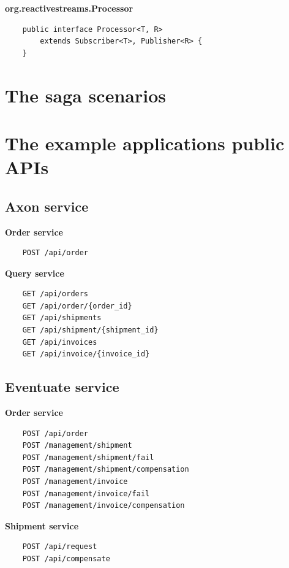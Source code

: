 \documentclass[oneside,
  digital, %
  table,   %
  nolof,     %
  nolot,     %
]{fithesis3}
\begin{document}
\noindent
\textbf{org.reactivestreams.Processor}

\begin{verbatim}
    public interface Processor<T, R> 
        extends Subscriber<T>, Publisher<R> {
    }
\end{verbatim}


\chapter{The saga scenarios}
\label{sec:appendix-scenarios}

\chapter{The example applications public APIs}
\label{sec:appendixAPI}

\section{Axon service}

\textbf{Order service}

\begin{verbatim}
    POST /api/order
\end{verbatim}

\noindent
\textbf{Query service}

\begin{verbatim}
    GET /api/orders
    GET /api/order/{order_id}
    GET /api/shipments
    GET /api/shipment/{shipment_id}
    GET /api/invoices
    GET /api/invoice/{invoice_id}
\end{verbatim}

\section{Eventuate service}

\textbf{Order service}

\begin{verbatim}
    POST /api/order
    POST /management/shipment
    POST /management/shipment/fail
    POST /management/shipment/compensation
    POST /management/invoice
    POST /management/invoice/fail
    POST /management/invoice/compensation
\end{verbatim}

\noindent
\textbf{Shipment service}

\begin{verbatim}
    POST /api/request
    POST /api/compensate
\end{verbatim}
\end{document}
